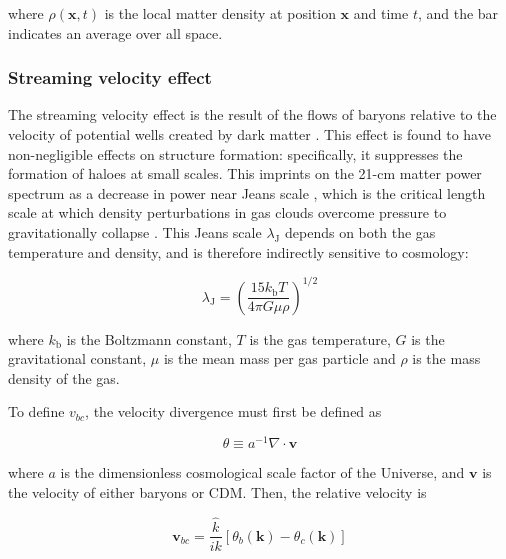 \documentclass[floats,floatfix,showpacs,amssymb,prd,superscriptaddress,nofootinbib]{revtex4-2} %
\newcommand{\red}{\textcolor{red}}
\begin{document}
\noindent where $\rho(\textbf{x}, t)$ is the local matter density at position $\textbf{x}$ and time $t$, and the bar indicates an average over all space.

\subsubsection{Streaming velocity effect}
The streaming velocity effect is the result of the flows of baryons relative to the velocity of potential wells created by dark matter \citep{Tseliakhovich_Hirata_2010}. This effect is found to have non-negligible effects on structure formation: specifically, it suppresses the formation of haloes at small scales. This imprints on the 21-cm matter power spectrum as a decrease in power near Jeans scale \citep{Tseliakhovich_Hirata_2010}, which is the critical length scale at which density perturbations in gas clouds overcome pressure to gravitationally collapse \citep{Jeans_1902}. This Jeans scale $\lambda_\text{J}$ depends on both the gas temperature and density, and is therefore indirectly sensitive to cosmology:

\begin{equation}
    \lambda_\text{J} = \left( \frac{15 k_\text{b} T}{4 \pi G \mu \rho} \right) ^{1/2}
\end{equation}

\noindent where $k_\text{b}$ is the Boltzmann constant, $T$ is the gas temperature, $G$ is the gravitational constant, $\mu$ is the mean mass per gas particle and $\rho$ is the mass density of the gas.


To define $v_{bc}$, the velocity divergence must first be defined as 

\begin{equation}
    \theta \equiv a^{-1} \nabla \cdot \textbf{v}
    \label{eq:velocity_divergence}
\end{equation}

\noindent where $a$ is the dimensionless cosmological scale factor of the Universe, and $\textbf{v}$ is the velocity of either baryons or CDM. 
Then, the relative velocity is

\begin{equation}
    \textbf{v}_{bc} = \frac{\hat{k}}{ik} \left[ \theta_b (\textbf{k}) - \theta_c (\textbf{k}) \right]
    \label{eq:vbc_definition}
\end{equation}
\end{document}
